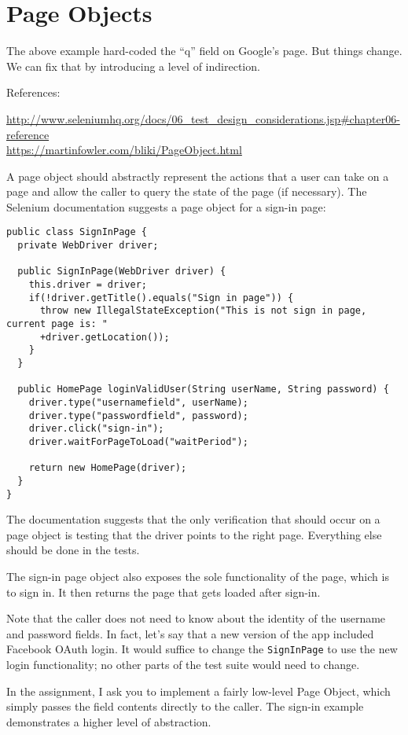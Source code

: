 \documentclass[11pt]{article}
\begin{document}
\section*{Page Objects}
The above example hard-coded the ``q'' field on Google's page.
But things change. We can fix that by introducing a level of
indirection.

References:

\url{http://www.seleniumhq.org/docs/06_test_design_considerations.jsp#chapter06-reference}\\
\url{https://martinfowler.com/bliki/PageObject.html}

A page object should abstractly represent the actions that
a user can take on a page and allow the caller to query
the state of the page (if necessary). The Selenium documentation
suggests a page object for a sign-in page:

\begin{lstlisting}
public class SignInPage {
  private WebDriver driver;

  public SignInPage(WebDriver driver) {
    this.driver = driver;
    if(!driver.getTitle().equals("Sign in page")) {
      throw new IllegalStateException("This is not sign in page, current page is: "
      +driver.getLocation());
    }
  }

  public HomePage loginValidUser(String userName, String password) {
    driver.type("usernamefield", userName);
    driver.type("passwordfield", password);
    driver.click("sign-in");
    driver.waitForPageToLoad("waitPeriod");

    return new HomePage(driver);
  }
}
\end{lstlisting}

The documentation suggests that the only verification that
should occur on a page object is testing that the driver
points to the right page. Everything else should be done in
the tests.

The sign-in page object also exposes the sole functionality of the
page, which is to sign in. It then returns the page that gets loaded
after sign-in.

Note that the caller does not need to know about the identity of the
username and password fields. In fact, let's say that a new version of
the app included Facebook OAuth login. It would suffice to change the
{\tt SignInPage} to use the new login functionality; no other parts of the test suite would need to change.

In the assignment, I ask you to implement a fairly low-level Page Object, which simply passes the field contents directly to the caller. The sign-in example demonstrates a higher level of abstraction.
\end{document}
